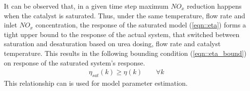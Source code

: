 It can be observed that, in a given time step maximum $NO_x$ reduction happens when the catalyst is saturated. Thus,
under the same temperature, flow rate and inlet $NO_x$ concentration, the response of the saturated model
(\ref{eqn::eta}) forms a tight upper bound to the response of the actual system, that switched between saturation and
desaturation based on urea dosing, flow rate and catalyst temperature. This results in the following bounding condition (\ref{eqn::eta_bound}) on response of the saturated system's response.
\begin{align}
        \eta_{sat}(k) \geq \eta(k) \qquad \forall k
        \label{eqn::eta_bound}
\end{align}
This relationship can is used for model parameter estimation.
